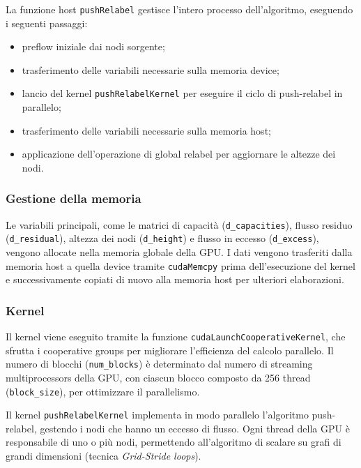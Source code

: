             La funzione host \verb|pushRelabel| gestisce l'intero processo dell'algoritmo, eseguendo i seguenti passaggi:
            \begin{itemize}
                \item preflow iniziale dai nodi sorgente;
                \item trasferimento delle variabili necessarie sulla memoria device;
                \item lancio del kernel \verb|pushRelabelKernel| per eseguire il ciclo di push-relabel in parallelo;
                \item trasferimento delle variabili necessarie sulla memoria host;
                \item applicazione dell'operazione di global relabel per aggiornare le altezze dei nodi.
            \end{itemize}

            \subsubsection{Gestione della memoria}
                Le variabili principali, come le matrici di capacità (\verb|d_capacities|), flusso residuo (\verb|d_residual|), altezza dei nodi (\verb|d_height|) e flusso in eccesso (\verb|d_excess|), vengono allocate nella memoria globale della GPU. I dati vengono trasferiti dalla memoria host a quella device tramite \verb|cudaMemcpy| prima dell'esecuzione del kernel e successivamente copiati di nuovo alla memoria host per ulteriori elaborazioni.

            \subsubsection{Kernel}
                Il kernel viene eseguito tramite la funzione \verb|cudaLaunchCooperativeKernel|, che sfrutta i cooperative groups per migliorare l'efficienza del calcolo parallelo. Il numero di blocchi (\verb|num_blocks|) è determinato dal numero di streaming multiprocessors della GPU, con ciascun blocco composto da 256 thread (\verb|block_size|), per ottimizzare il parallelismo.

                Il kernel \verb|pushRelabelKernel| implementa in modo parallelo l'algoritmo push-relabel, gestendo i nodi che hanno un eccesso di flusso. Ogni thread della GPU è responsabile di uno o più nodi, permettendo all'algoritmo di scalare su grafi di grandi dimensioni (tecnica \textit{Grid-Stride loops}). 

